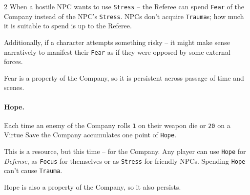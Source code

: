 \begin{multicols*}{2}
When a hostile NPC wants to use \texttt{Stress} -- the Referee can spend \texttt{Fear} of the Company instead of the NPC's \texttt{Stress}. 
NPCs don't acquire \texttt{Trauma}s; how much it is suitable to spend is up to the Referee.

Additionally, if a character attempts something risky -- it might make sense narratively to manifest their \texttt{Fear} as if they were opposed by some external forces. 

Fear is a property of the Company, so it is persistent across passage of time and scenes.

\paragraph{Hope.} Each time an enemy of the Company rolls \texttt{1} on their weapon die or \texttt{20} on a Virtue Save the Company accumulates one point of \texttt{Hope}.

This is a resource, but this time -- for the Company. 
Any player can use \texttt{Hope} for \emph{Defense}, as \texttt{Focus} for themselves or as \texttt{Stress} for friendly NPCs. 
Spending \texttt{Hope} can't cause \texttt{Trauma}.

Hope is also a property of the Company, so it also persists. 

\end{multicols*}
